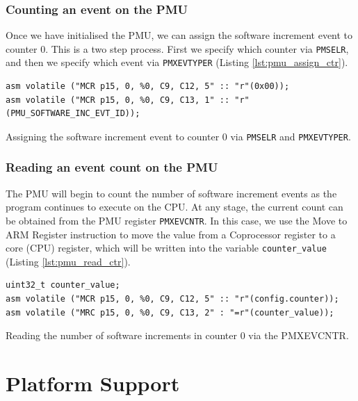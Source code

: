 {\subsubsection{Counting an event on the PMU}

Once we have initialised the PMU, we can assign the software increment event to counter 0. This is a two step process. First we specify which counter via \texttt{PMSELR}, and then we specify which event via \texttt{PMXEVTYPER} (Listing \ref{lst:pmu_assign_ctr}).

\begin{listing}[!ht]
    \begin{verbatim}
asm volatile ("MCR p15, 0, %0, C9, C12, 5" :: "r"(0x00));
asm volatile ("MCR p15, 0, %0, C9, C13, 1" :: "r"(PMU_SOFTWARE_INC_EVT_ID));
    \end{verbatim}
    \caption{Assigning the software increment event to counter 0 via \texttt{PMSELR} and \texttt{PMXEVTYPER}.} 
    \label{lst:pmu_assign_ctr}
\end{listing}

\subsubsection{Reading an event count on the PMU}

The PMU will begin to count the number of software increment events as the program continues to execute on the CPU. At any stage, the current count can be obtained from the PMU register \texttt{PMXEVCNTR}. In this case, we use the Move to ARM Register \cite{DocsArmMRC} instruction to move the value from a Coprocessor register to a core (CPU) register, which will be written into the variable \texttt{counter\_value} (Listing \ref{lst:pmu_read_ctr}).

\begin{listing}[!ht]
    \begin{verbatim}
uint32_t counter_value;
asm volatile ("MCR p15, 0, %0, C9, C12, 5" :: "r"(config.counter));
asm volatile ("MRC p15, 0, %0, C9, C13, 2" : "=r"(counter_value));
    \end{verbatim}
    \caption{Reading the number of software increments in counter 0 via the PMXEVCNTR.} 
    \label{lst:pmu_read_ctr}
\end{listing}

\section{Platform Support}\label{sect:platform_support}

}
